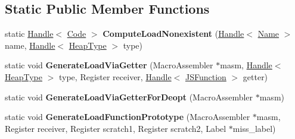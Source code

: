 \subsection*{Static Public Member Functions}
\begin{DoxyCompactItemize}
\item 
\hypertarget{classv8_1_1internal_1_1_named_load_handler_compiler_a190c4d113f8ef5b9e7c5e36c1bedcc2a}{}static \hyperlink{classv8_1_1internal_1_1_handle}{Handle}$<$ \hyperlink{classv8_1_1internal_1_1_code}{Code} $>$ {\bfseries Compute\+Load\+Nonexistent} (\hyperlink{classv8_1_1internal_1_1_handle}{Handle}$<$ \hyperlink{classv8_1_1internal_1_1_name}{Name} $>$ name, \hyperlink{classv8_1_1internal_1_1_handle}{Handle}$<$ \hyperlink{classv8_1_1internal_1_1_type_impl}{Heap\+Type} $>$ type)\label{classv8_1_1internal_1_1_named_load_handler_compiler_a190c4d113f8ef5b9e7c5e36c1bedcc2a}

\item 
\hypertarget{classv8_1_1internal_1_1_named_load_handler_compiler_ae331a07ee1793d3738bbdea36683d22d}{}static void {\bfseries Generate\+Load\+Via\+Getter} (Macro\+Assembler $\ast$masm, \hyperlink{classv8_1_1internal_1_1_handle}{Handle}$<$ \hyperlink{classv8_1_1internal_1_1_type_impl}{Heap\+Type} $>$ type, Register receiver, \hyperlink{classv8_1_1internal_1_1_handle}{Handle}$<$ \hyperlink{classv8_1_1internal_1_1_j_s_function}{J\+S\+Function} $>$ getter)\label{classv8_1_1internal_1_1_named_load_handler_compiler_ae331a07ee1793d3738bbdea36683d22d}

\item 
\hypertarget{classv8_1_1internal_1_1_named_load_handler_compiler_a2dabd036a1b57ba6f3922fa97bb3923c}{}static void {\bfseries Generate\+Load\+Via\+Getter\+For\+Deopt} (Macro\+Assembler $\ast$masm)\label{classv8_1_1internal_1_1_named_load_handler_compiler_a2dabd036a1b57ba6f3922fa97bb3923c}

\item 
\hypertarget{classv8_1_1internal_1_1_named_load_handler_compiler_ab1e2b4faf9bb03146129d2dfce125fb2}{}static void {\bfseries Generate\+Load\+Function\+Prototype} (Macro\+Assembler $\ast$masm, Register receiver, Register scratch1, Register scratch2, Label $\ast$miss\+\_\+label)\label{classv8_1_1internal_1_1_named_load_handler_compiler_ab1e2b4faf9bb03146129d2dfce125fb2}

\end{DoxyCompactItemize}
